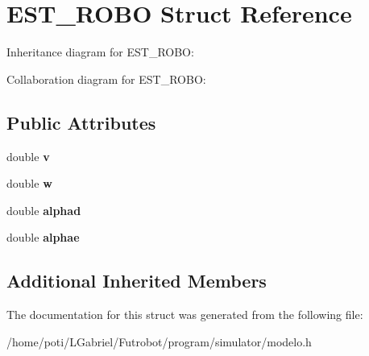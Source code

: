 \hypertarget{structEST__ROBO}{}\section{E\+S\+T\+\_\+\+R\+O\+BO Struct Reference}
\label{structEST__ROBO}


Inheritance diagram for E\+S\+T\+\_\+\+R\+O\+BO\+:


Collaboration diagram for E\+S\+T\+\_\+\+R\+O\+BO\+:
\subsection*{Public Attributes}
\begin{DoxyCompactItemize}
\item 
double {\bfseries v}\hypertarget{structEST__ROBO_a517b967294b71460dcc4eac0b7d77acb}{}\label{structEST__ROBO_a517b967294b71460dcc4eac0b7d77acb}

\item 
double {\bfseries w}\hypertarget{structEST__ROBO_a0ccc8b4bd0666159b7d526eee8ccab1e}{}\label{structEST__ROBO_a0ccc8b4bd0666159b7d526eee8ccab1e}

\item 
double {\bfseries alphad}\hypertarget{structEST__ROBO_a4a1520230576f57b24fc8a2e7f431b04}{}\label{structEST__ROBO_a4a1520230576f57b24fc8a2e7f431b04}

\item 
double {\bfseries alphae}\hypertarget{structEST__ROBO_a9361e9e118e878cc5a357f882e58e6b1}{}\label{structEST__ROBO_a9361e9e118e878cc5a357f882e58e6b1}

\end{DoxyCompactItemize}
\subsection*{Additional Inherited Members}


The documentation for this struct was generated from the following file\+:\begin{DoxyCompactItemize}
\item 
/home/poti/\+L\+Gabriel/\+Futrobot/program/simulator/modelo.\+h\end{DoxyCompactItemize}
